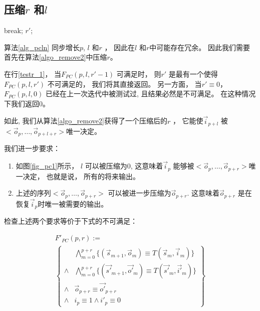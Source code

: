 \subsection{压缩$r$ 和$l$}\label{reduceing}

\begin{algorithm}[t]
\begin{algorithmic}[1]
\label{testr_1}
  \STATE  break;
  \ENDIF
\ENDFOR
\RETURN $r'$;
\caption{$RemoveRedundancy(p,l,r)$}
\label{algo_remove2}
\end{algorithmic}
\end{algorithm}



算法\ref{alg_pcln} 同步增长$p$, $l$ 和$r$ ，
因此在$l$ 和$r$中可能存在冗余。
因此我们需要首先在算法\ref{algo_remove2}中压缩$r$。


在行\ref{testr_1}，
当$F_{PC}(p,l,r'-1)$ 可满足时，
则$r'$ 是最有一个使得$F_{PC}(p,l,r')$ 不可满足的，
我们将其直接返回。
另一方面，
当$r'\equiv 0$，
$F_{PC}(p,l,0)$ 已经在上一次迭代中被测试过,
且结果必然是不可满足。
在这种情况下我们返回$0$。


如此,
我们从算法\ref{algo_remove2}获得了一个压缩后的$r$ ，
它能使$\vec{i}_{p+l}$ 被$<\vec{o}_{p},\dots,\vec{o}_{p+l+r}>$唯一决定。

我们进一步要求：
\begin{enumerate}
 \item 如图\ref{fig_pc1}所示，
 $l$ 可以被压缩为0,
 这意味着$\vec{i}_{p}$ 能够被$<\vec{o}_{p},\dots,\vec{o}_{p+r}>$唯一决定，
 也就是说，
 所有的将来输出。
 \item 上述的序列$<\vec{o}_{p},\dots,\vec{o}_{p+r}>$
 可以被进一步压缩为$\vec{o}_{p+r}$.
 这意味着$\vec{o}_{p+r}$ 是在恢复$\vec{i}_p$时唯一被需要的输出。
\end{enumerate}

检查上述两个要求等价于下式的不可满足：

\begin{multline}\label{uniqt11}
F'_{PC}(p,r):=\\
\left\{
\begin{array}{cc}
&\bigwedge_{m=0}^{p+r}
\{
(\vec{s}_{m+1},\vec{o}_m)\equiv T(\vec{s}_m,\vec{i}_m)
\}
\\
\wedge&\bigwedge_{m=0}^{p+r}
\{
(\vec{s'}_{m+1},\vec{o'}_m)\equiv T(\vec{s'}_m,\vec{i'}_m)
\}
\\
\wedge&\vec{o}_{p+r}\equiv \vec{o'}_{p+r} \\
\wedge& i_{p}\equiv 1 \wedge  i'_{p}\equiv 0
\end{array}
\right\}
\end{multline}


